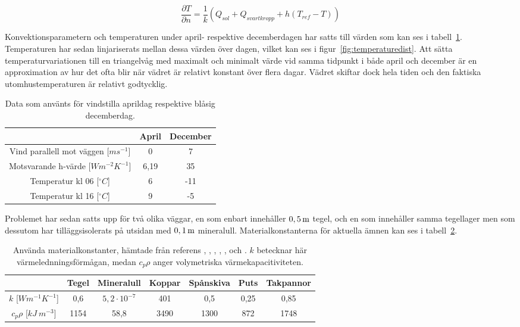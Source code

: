 \begin{equation}
\label{eq:wallneumann}
\frac{\partial T}{\partial n} = \frac{1}{k}\left( Q_{sol} + Q_{svartkropp} + h(T_{ref}-T) \right)
\end{equation}

Konvektionsparametern och temperaturen under april- respektive decemberdagen har satts till värden som kan ses i tabell~\ref{tbl:aprdec}. Temperaturen har sedan linjariserats mellan dessa värden över dagen, vilket kan ses i figur~\ref{fig:temperaturedist}. Att sätta temperaturvariationen till en triangelvåg med maximalt och minimalt värde vid samma tidpunkt i både april och december är en approximation av hur det ofta blir när vädret är relativt konstant över flera dagar. Vädret skiftar dock hela tiden och den faktiska utomhustemperaturen är relativt godtycklig.

\begin{table}[hpbt]
\centering
\caption{Data som använts för vindstilla aprildag respektive blåsig decemberdag.}
\begin{tabular}{|c|c|c|}
\hline
& April & December \\
\hline
Vind parallell mot väggen [$ms^{-1}$] & 0 & 7 \\
Motsvarande h-värde [$Wm^{-2}K^{-1}$] & 6,19 & 35 \\
Temperatur kl 06 [$^{\circ}C$] & 6 & -11 \\
Temperatur kl 16 [$^{\circ}C$] & 9 & -5\\
\hline
\end{tabular}
\label{tbl:aprdec}
\end{table}


Problemet har sedan satts upp för två olika väggar, en som enbart innehåller $\unit[0,5]{m}$ tegel, och en som innehåller samma tegellager men som dessutom har tilläggsisolerats på utsidan med $\unit[0,1]{m}$ mineralull. Materialkonstanterna för aktuella ämnen kan ses i tabell~\ref{tbl:materialconstants}.

\begin{table}[hpbt]
\centering
\caption{Använda materialkonstanter, hämtade från referens \cite{kandidatarbete2010}, \cite{engineeringtoolboxdensity}, \cite{bkvthermal}, \cite{engineeringtoolboxspecificheat}, \cite{engineeringcom}, \cite{engineeringtoolboxthermalconductivity} och \cite{ozel11}. $k$ betecknar här värmelednningsförmågan, medan $c_p\rho$ anger volymetriska värmekapacitiviteten.}
\begin{tabular}{|c|c|c|c|c|c|c|}
\hline
& Tegel & Mineralull & Koppar & Spånskiva & Puts & Takpannor \\
\hline
$k$ [$Wm^{-1}K^{-1}$] & 0,6 & $5,2\cdot 10^{-7}$ & 401 & 0,5 & 0,25 & 0,85\\
$c_p \rho$ [$kJ~m^{-3}$] & 1154 & 58,8 & 3490 & 1300 & 872 & 1748\\
\hline
\end{tabular}
\label{tbl:materialconstants}
\end{table}

